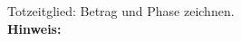 \begin{question}[section=3,name={Totzeitglied},difficulty=4,type=mdl,tags={}]
	Totzeitglied: Betrag und Phase zeichnen.
	\\ \textbf{Hinweis:}\\
	
\end{question}
\begin{solution}
	
\end{solution}